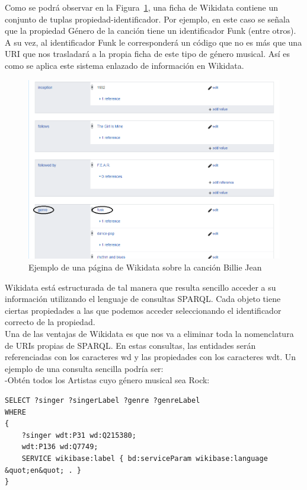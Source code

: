 Como se podrá observar en la Figura~\ref{fig:wikidataPage}, una ficha de Wikidata contiene un conjunto de tuplas propiedad-identificador. Por ejemplo, en este caso se señala que la propiedad Género de la canción tiene un identificador Funk (entre otros). A su vez, al  identificador Funk le corresponderá un código que no es más que una URI que nos trasladará a la propia ficha de este tipo de género musical. Así es como se aplica este sistema enlazado de información en Wikidata.\\

\begin{figure}[h!]
	\centering
	\includegraphics[width = 1\textwidth]{Imagenes/Bitmap/WikidataEx.png}
	\caption{Ejemplo de una página de Wikidata sobre la canción Billie Jean}
	\label{fig:wikidataPage}
\end{figure}

Wikidata está estructurada de tal manera que resulta sencillo acceder a su información utilizando el lenguaje de consultas SPARQL. Cada objeto tiene ciertas propiedades a las que podemos acceder seleccionando el identificador correcto de la propiedad.\\

Una de las ventajas de Wikidata es que nos va a eliminar toda la nomenclatura de URIs propias de SPARQL. En estas consultas, las entidades serán referenciadas con los caracteres wd y las propiedades con los caracteres wdt. Un ejemplo de una consulta sencilla podría ser:\\

-Obtén todos los Artistas cuyo género musical sea Rock:\\
\begin{lstlisting}[language=SPARQL]
SELECT ?singer ?singerLabel ?genre ?genreLabel
WHERE
{
	?singer wdt:P31 wd:Q215380;
	wdt:P136 wd:Q7749;
	SERVICE wikibase:label { bd:serviceParam wikibase:language &quot;en&quot; . }
}
\end{lstlisting}
\bigskip

